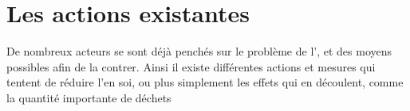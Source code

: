 \section{Les actions existantes}

De nombreux acteurs se sont déjà penchés sur le problème de l'\op , et des moyens possibles afin de la contrer. Ainsi il existe différentes actions et mesures qui tentent de réduire l'\op en soi, ou plus simplement les effets qui en découlent, comme la quantité importante de déchets